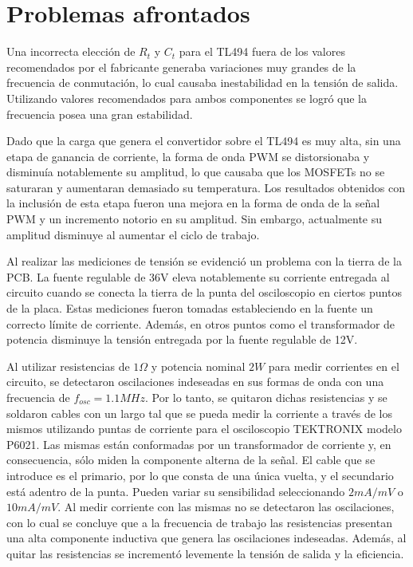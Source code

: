 \section{Problemas afrontados}

Una incorrecta elección de $R_t$ y $C_t$ para el TL494 fuera de los valores recomendados por el fabricante generaba variaciones muy grandes de la frecuencia de conmutación, 
lo cual causaba inestabilidad en la tensión de salida. 
Utilizando valores recomendados para ambos componentes se logró que la frecuencia posea una gran estabilidad.

Dado que la carga que genera el convertidor sobre el TL494 es muy alta, sin una etapa de ganancia de corriente, la forma de onda PWM 
se distorsionaba y disminuía notablemente su amplitud, lo que causaba que los MOSFETs no se saturaran y aumentaran demasiado su temperatura.
Los resultados obtenidos con la inclusión de esta etapa fueron una mejora en la forma de onda de la señal PWM y un incremento notorio en su amplitud.
Sin embargo, actualmente su amplitud disminuye al aumentar el ciclo de trabajo.

Al realizar las mediciones de tensión se evidenció un problema con la tierra de la PCB. 
La fuente regulable de 36V eleva notablemente su corriente entregada al circuito 
cuando se conecta la tierra de la punta del osciloscopio en ciertos puntos de la placa. 
Estas mediciones fueron tomadas estableciendo en la fuente un correcto límite de corriente. 
Además, en otros puntos como el transformador de potencia disminuye la tensión entregada por la fuente regulable de 12V. 

Al utilizar resistencias de $1\Omega$ y potencia nominal $2W$ para medir corrientes en el circuito, 
se detectaron oscilaciones indeseadas en sus formas de onda con una frecuencia de $f_{osc}=1.1MHz$. 
Por lo tanto, se quitaron dichas resistencias y se soldaron cables con un largo tal que se pueda medir 
la corriente a través de los mismos utilizando puntas de corriente para el osciloscopio TEKTRONIX modelo P6021. 
Las mismas están conformadas por un transformador de corriente y, en consecuencia, sólo miden la componente alterna de la señal.
El cable que se introduce es el primario, por lo que consta de una única vuelta, y el secundario está adentro de la punta. 
Pueden variar su sensibilidad seleccionando $2mA/mV$ o $10mA/mV$.
Al medir corriente con las mismas no se detectaron las oscilaciones,
con lo cual se concluye que a la frecuencia de trabajo las resistencias presentan una alta componente inductiva que genera las oscilaciones indeseadas. 
Además, al quitar las resistencias se incrementó levemente la tensión de salida y la eficiencia. 

